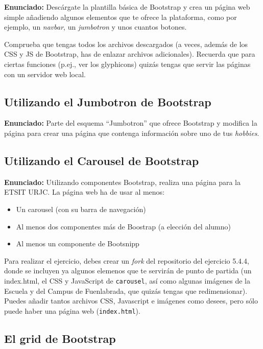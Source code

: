 \textbf{Enunciado:} Descárgate la plantilla básica de Bootstrap y 
crea un página web simple añadiendo algunos elementos que te ofrece la
plataforma, como por ejemplo, un \emph{navbar}, un \emph{jumbotron} y unos
cuantos botones. 

Comprueba que tengas todos los archivos descargados (a veces, además de los CSS y JS de Bootstrap, has de enlazar archivos adicionales). Recuerda que para ciertas funciones (p.ej., ver los glyphicons) quizás tengas que servir las páginas con un servidor web local.


\subsection{Utilizando el Jumbotron de Bootstrap}
\label{subsec:jumbotron}

\textbf{Enunciado:} Parte del esquema ``Jumbotron'' que ofrece Bootstrap
y modifica la página para crear una página que contenga información sobre uno de tus
\emph{hobbies}.

\subsection{Utilizando el Carousel de Bootstrap}
\label{subsec:carousel}

\textbf{Enunciado:} Utilizando componentes Bootstrap, realiza una página para la ETSIT URJC. La página web ha de usar al menos:

\begin{itemize}
   \item Un carousel (con su barra de navegación)
   \item Al menos dos componentes más de Boostrap (a elección del alumno)
   \item Al menos un componente de Bootsnipp
\end{itemize}

Para realizar el ejercicio, debes crear un \emph{fork} del repositorio del ejercicio 5.4.4, donde se incluyen ya algunos elemenos que te servirán de punto de partida (un index.html, el CSS y JavaScript de \texttt{carousel}, así como algunas imágenes de la Escuela y del Campus de Fuenlabrada, que quizás tengas que redimensionar). Puedes añadir tantos archivos CSS, Javascript e imágenes como desees, pero sólo puede haber una página web (\texttt{index.html}).

\subsection{El grid de Bootstrap}
\label{subsec:grid-bootstrap}

